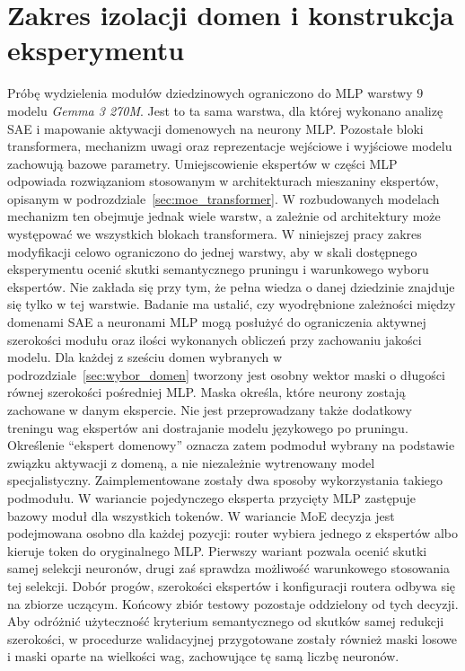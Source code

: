 \section{Zakres izolacji domen i konstrukcja eksperymentu}
\label{sec:izolacja_domen}
Próbę wydzielenia modułów dziedzinowych ograniczono do MLP warstwy $9$ modelu \textit{Gemma 3 270M}. Jest to ta sama warstwa, dla której wykonano analizę SAE i mapowanie aktywacji domenowych na neurony MLP. Pozostałe bloki transformera, mechanizm uwagi oraz reprezentacje wejściowe i wyjściowe modelu zachowują bazowe parametry. \newline
Umiejscowienie ekspertów w części MLP odpowiada rozwiązaniom stosowanym w architekturach mieszaniny ekspertów, opisanym w podrozdziale~\ref{sec:moe_transformer}. W rozbudowanych modelach mechanizm ten obejmuje jednak wiele warstw, a zależnie od architektury może występować we wszystkich blokach transformera. W niniejszej pracy zakres modyfikacji celowo ograniczono do jednej warstwy, aby w skali dostępnego eksperymentu ocenić skutki semantycznego pruningu i warunkowego wyboru ekspertów. Nie zakłada się przy tym, że pełna wiedza o danej dziedzinie znajduje się tylko w tej warstwie. Badanie ma ustalić, czy wyodrębnione zależności między domenami SAE a neuronami MLP mogą posłużyć do ograniczenia aktywnej szerokości modułu oraz ilości wykonanych obliczeń przy zachowaniu jakości modelu. \newline
Dla każdej z sześciu domen wybranych w podrozdziale~\ref{sec:wybor_domen} tworzony jest osobny wektor maski o długości równej szerokości pośredniej MLP. Maska określa, które neurony zostają zachowane w danym ekspercie. Nie jest przeprowadzany także dodatkowy treningu wag ekspertów ani dostrajanie modelu językowego po pruningu. Określenie \enquote{ekspert domenowy} oznacza zatem podmoduł wybrany na podstawie związku aktywacji z domeną, a nie niezależnie wytrenowany model specjalistyczny. \newline
Zaimplementowane zostały dwa sposoby wykorzystania takiego podmodułu. W wariancie pojedynczego eksperta przycięty MLP zastępuje bazowy moduł dla wszystkich tokenów. W wariancie MoE decyzja jest podejmowana osobno dla każdej pozycji: router wybiera jednego z ekspertów albo kieruje token do oryginalnego MLP. Pierwszy wariant pozwala ocenić skutki samej selekcji neuronów, drugi zaś sprawdza możliwość warunkowego stosowania tej selekcji. \newline
Dobór progów, szerokości ekspertów i konfiguracji routera odbywa się na zbiorze uczącym. Końcowy zbiór testowy pozostaje oddzielony od tych decyzji. Aby odróżnić użyteczność kryterium semantycznego od skutków samej redukcji szerokości, w procedurze walidacyjnej przygotowane zostały również maski losowe i maski oparte na wielkości wag, zachowujące tę samą liczbę neuronów.

